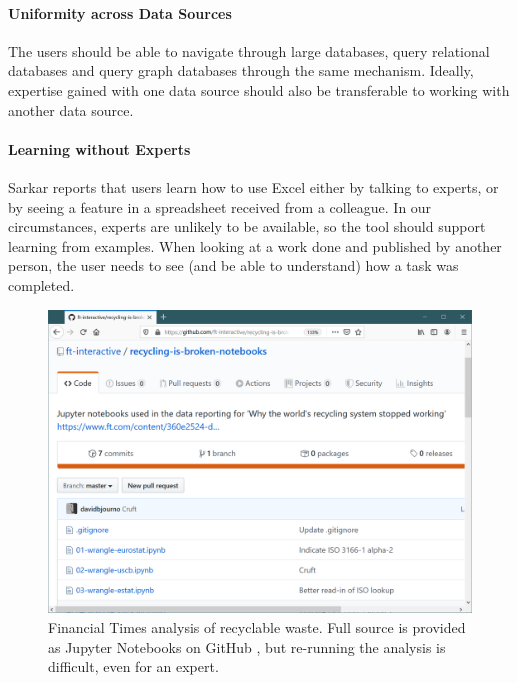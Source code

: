 \documentclass[manuscript,review,anonymous]{acmart}
\begin{document}
\paragraph{Uniformity across Data Sources}
The users should be able to navigate through large databases, query relational databases and
query graph databases through the same mechanism. Ideally, expertise gained with one data source
should also be transferable to working with another data source.

\paragraph{Learning without Experts}
Sarkar \cite{learning} reports that users learn how to use Excel either by talking to experts,
or by seeing a feature in a spreadsheet received from a colleague. In our circumstances, experts
are unlikely to be available, so the tool should support learning from examples. When looking at
a work done and published by another person, the user needs to see (and be able to understand)
how a task was completed.

\begin{figure}
\includegraphics[width=1\columnwidth]{figures/ft}
\caption{Financial Times analysis of recyclable waste. Full source is provided as Jupyter Notebooks
on GitHub \cite{ftnotebooks}, but re-running the analysis is difficult, even for an expert.}
\label{fig:ft}
\end{figure}

\end{document}

